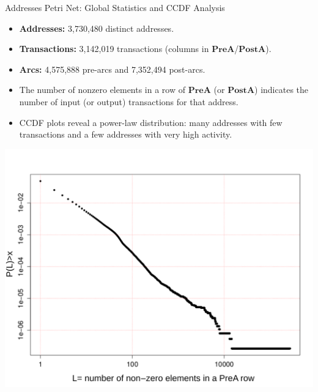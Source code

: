 \documentclass{beamer}
\begin{document}
\begin{frame}{Addresses Petri Net: Global Statistics and CCDF Analysis}
    \footnotesize
    \begin{itemize}
        \item \textbf{Addresses:} 3,730,480 distinct addresses.
        \item \textbf{Transactions:} 3,142,019 transactions (columns in $\mathbf{PreA}$/$\mathbf{PostA}$).
        \item \textbf{Arcs:} 4,575,888 pre-arcs and 7,352,494 post-arcs.
        \item The number of nonzero elements in a row of $\mathbf{PreA}$ (or $\mathbf{PostA}$) indicates the number of input (or output) transactions for that address.
        \item CCDF plots reveal a power-law distribution: many addresses with few transactions and a few addresses with very high activity.
    \end{itemize}
    \vspace{-0.1cm}
    \begin{minipage}[c]{0.45\textwidth}
        \centering
        \includegraphics[width=0.95\linewidth]{PreA}
        \footnotesize
        \label{fig_preA_CCDF}
    \end{minipage}
    \hspace{0.5cm}
    \begin{minipage}[c]{0.45\textwidth}
        \centering

\end{minipage}
\end{frame}
\end{document}
